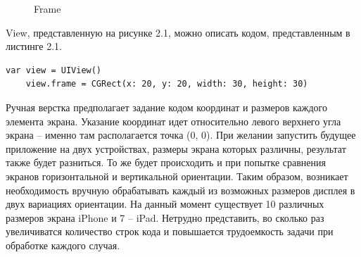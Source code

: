 \begin{figure}[h!]
	\caption{Frame}
	\label{fig:frame}
\end{figure}

View, представленную на рисунке 2.1, можно описать кодом, представленным в листинге 2.1. 

\begin{lstlisting}[caption=Задание свойства frame для UIView]
	var view = UIView()
	view.frame = CGRect(x: 20, y: 20, width: 30, height: 30)
\end{lstlisting}

Ручная верстка предполагает задание кодом координат и размеров каждого элемента экрана. Указание координат идет относительно левого верхнего угла экрана -- именно там располагается точка (0, 0). При желании запустить будущее приложение на двух устройствах, размеры экрана которых различны, результат также будет разниться. То же будет происходить и при попытке сравнения экранов горизонтальной и вертикальной ориентации. Таким образом, возникает необходимость вручную обрабатывать каждый из возможных размеров дисплея в двух вариациях ориентации. На данный момент существует 10 различных размеров экрана iPhone и 7 -- iPad. Нетрудно представить, во сколько раз увеличиватся количество строк кода и повышается трудоемкость задачи при обработке каждого случая. 

